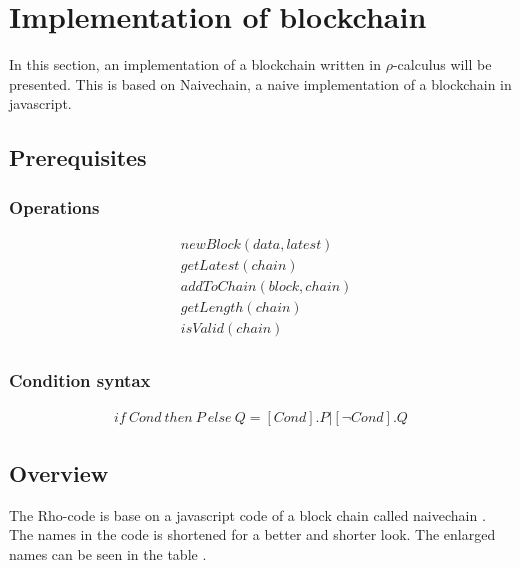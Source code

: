 \section{Implementation of blockchain}
In this section, an implementation of a blockchain written in $\rho$-calculus will be presented. This is based on Naivechain, a naive implementation of a blockchain in javascript.

\subsection{Prerequisites}

\subsubsection{Operations}

\begin{align*}
    &newBlock(data,latest)\\
    &getLatest(chain)\\
    &addToChain(block,chain)\\
    &getLength(chain)\\
    &isValid(chain)\\
\end{align*}

\subsubsection{Condition syntax}

\begin{align*}
    if\ Cond\ then\ P\ else\ Q = [Cond].P | [\neg Cond].Q
\end{align*}

\subsection{Overview}
The Rho-code is base on a javascript code of a block chain called naivechain \cite{naivechain}.
The names in the code is shortened for a better and shorter look. The enlarged names can be seen in the table .

